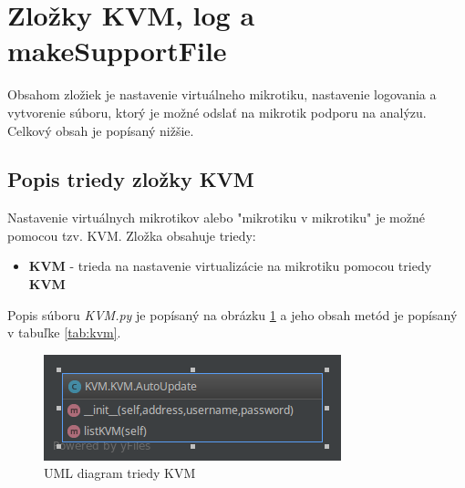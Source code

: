 \section{Zložky KVM, log a makeSupportFile}
Obsahom zložiek je nastavenie virtuálneho mikrotiku, nastavenie logovania a vytvorenie súboru, ktorý je možné odslať na mikrotik podporu na analýzu. Celkový obsah je popísaný nižšie.
\subsection{Popis triedy zložky KVM}
Nastavenie virtuálnych mikrotikov alebo "mikrotiku v mikrotiku" je možné pomocou tzv. KVM. Zložka obsahuje triedy:\begin{itemize}
\item \textbf{KVM} - trieda na nastavenie virtualizácie na mikrotiku pomocou triedy \textbf{KVM}
\end{itemize}
Popis súboru \textit{KVM.py} je popísaný na obrázku \ref{fig:kvm}  a jeho obsah metód je popísaný v tabuľke \ref{tab:kvm}.
\begin{table}[H]
\caption{Tabuľka metód triedy KVM}
\label{tab:kvm}
\end{table}
\begin{figure}[H]
\centering
\includegraphics[scale=0.6]{../text/kvmfig.png}
\caption{UML diagram triedy KVM}
\label{fig:kvm}
\end{figure}
